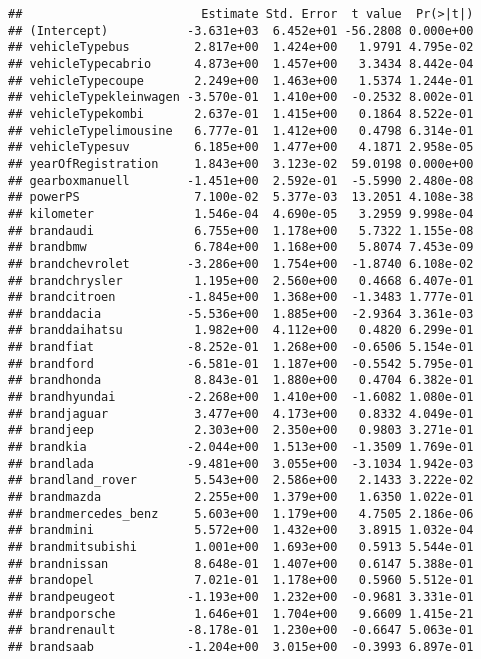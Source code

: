 \documentclass[]{article}
\begin{document}
\begin{verbatim}
##                         Estimate Std. Error  t value  Pr(>|t|)
## (Intercept)           -3.631e+03  6.452e+01 -56.2808 0.000e+00
## vehicleTypebus         2.817e+00  1.424e+00   1.9791 4.795e-02
## vehicleTypecabrio      4.873e+00  1.457e+00   3.3434 8.442e-04
## vehicleTypecoupe       2.249e+00  1.463e+00   1.5374 1.244e-01
## vehicleTypekleinwagen -3.570e-01  1.410e+00  -0.2532 8.002e-01
## vehicleTypekombi       2.637e-01  1.415e+00   0.1864 8.522e-01
## vehicleTypelimousine   6.777e-01  1.412e+00   0.4798 6.314e-01
## vehicleTypesuv         6.185e+00  1.477e+00   4.1871 2.958e-05
## yearOfRegistration     1.843e+00  3.123e-02  59.0198 0.000e+00
## gearboxmanuell        -1.451e+00  2.592e-01  -5.5990 2.480e-08
## powerPS                7.100e-02  5.377e-03  13.2051 4.108e-38
## kilometer              1.546e-04  4.690e-05   3.2959 9.998e-04
## brandaudi              6.755e+00  1.178e+00   5.7322 1.155e-08
## brandbmw               6.784e+00  1.168e+00   5.8074 7.453e-09
## brandchevrolet        -3.286e+00  1.754e+00  -1.8740 6.108e-02
## brandchrysler          1.195e+00  2.560e+00   0.4668 6.407e-01
## brandcitroen          -1.845e+00  1.368e+00  -1.3483 1.777e-01
## branddacia            -5.536e+00  1.885e+00  -2.9364 3.361e-03
## branddaihatsu          1.982e+00  4.112e+00   0.4820 6.299e-01
## brandfiat             -8.252e-01  1.268e+00  -0.6506 5.154e-01
## brandford             -6.581e-01  1.187e+00  -0.5542 5.795e-01
## brandhonda             8.843e-01  1.880e+00   0.4704 6.382e-01
## brandhyundai          -2.268e+00  1.410e+00  -1.6082 1.080e-01
## brandjaguar            3.477e+00  4.173e+00   0.8332 4.049e-01
## brandjeep              2.303e+00  2.350e+00   0.9803 3.271e-01
## brandkia              -2.044e+00  1.513e+00  -1.3509 1.769e-01
## brandlada             -9.481e+00  3.055e+00  -3.1034 1.942e-03
## brandland_rover        5.543e+00  2.586e+00   2.1433 3.222e-02
## brandmazda             2.255e+00  1.379e+00   1.6350 1.022e-01
## brandmercedes_benz     5.603e+00  1.179e+00   4.7505 2.186e-06
## brandmini              5.572e+00  1.432e+00   3.8915 1.032e-04
## brandmitsubishi        1.001e+00  1.693e+00   0.5913 5.544e-01
## brandnissan            8.648e-01  1.407e+00   0.6147 5.388e-01
## brandopel              7.021e-01  1.178e+00   0.5960 5.512e-01
## brandpeugeot          -1.193e+00  1.232e+00  -0.9681 3.331e-01
## brandporsche           1.646e+01  1.704e+00   9.6609 1.415e-21
## brandrenault          -8.178e-01  1.230e+00  -0.6647 5.063e-01
## brandsaab             -1.204e+00  3.015e+00  -0.3993 6.897e-01

\end{verbatim}
\end{document}
